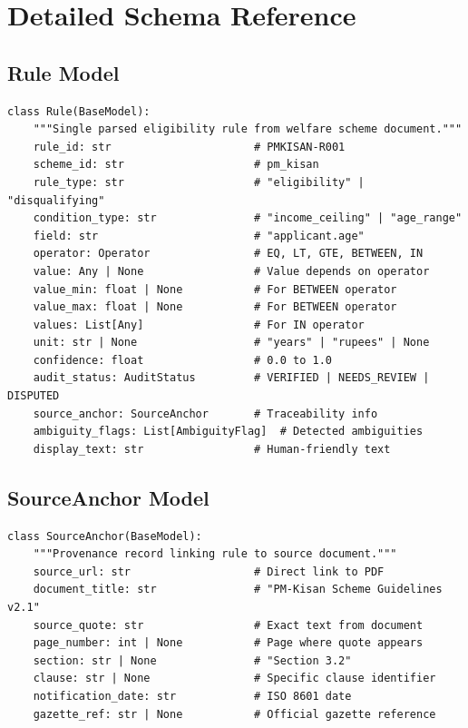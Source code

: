 \documentclass[11pt,a4paper]{report}
\begin{document}
\chapter{Detailed Schema Reference}

\section{Rule Model}

\begin{lstlisting}
class Rule(BaseModel):
    """Single parsed eligibility rule from welfare scheme document."""
    rule_id: str                      # PMKISAN-R001
    scheme_id: str                    # pm_kisan
    rule_type: str                    # "eligibility" | "disqualifying"
    condition_type: str               # "income_ceiling" | "age_range"
    field: str                        # "applicant.age"
    operator: Operator                # EQ, LT, GTE, BETWEEN, IN
    value: Any | None                 # Value depends on operator
    value_min: float | None           # For BETWEEN operator
    value_max: float | None           # For BETWEEN operator
    values: List[Any]                 # For IN operator
    unit: str | None                  # "years" | "rupees" | None
    confidence: float                 # 0.0 to 1.0
    audit_status: AuditStatus         # VERIFIED | NEEDS_REVIEW | DISPUTED
    source_anchor: SourceAnchor       # Traceability info
    ambiguity_flags: List[AmbiguityFlag]  # Detected ambiguities
    display_text: str                 # Human-friendly text
\end{lstlisting}

\section{SourceAnchor Model}

\begin{lstlisting}
class SourceAnchor(BaseModel):
    """Provenance record linking rule to source document."""
    source_url: str                   # Direct link to PDF
    document_title: str               # "PM-Kisan Scheme Guidelines v2.1"
    source_quote: str                 # Exact text from document
    page_number: int | None           # Page where quote appears
    section: str | None               # "Section 3.2"
    clause: str | None                # Specific clause identifier
    notification_date: str            # ISO 8601 date
    gazette_ref: str | None           # Official gazette reference
\end{lstlisting}
\end{document}
